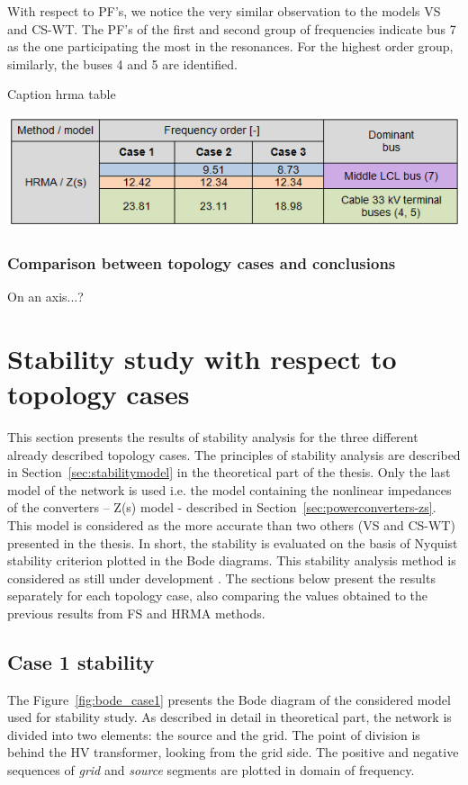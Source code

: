 \documentclass[12pt]{report} %
\begin{document}
With respect to PF's, we notice the very similar observation to the models VS and CS-WT. The PF's of the first and second group of frequencies indicate bus 7 as the one participating the most in the resonances. For the highest order group, similarly, the buses 4 and 5 are identified.

\begin{table}[htb]
	\centering
	\caption{Caption hrma table}
	\includegraphics[width=1\textwidth]{img/Case123/HRMA_Zs_table.png}
  	\label{table:comparison_hrmazs}
\end{table}
\FloatBarrier

\subsubsection{Comparison between topology cases and conclusions}
On an axis...?

\section{Stability study with respect to topology cases}
This section presents the results of stability analysis for the three different already described topology cases. The principles of stability analysis are described in Section~\ref{sec:stabilitymodel} in the theoretical part of the thesis. Only the last model of the network is used i.e. the model containing the nonlinear impedances of the converters – Z(s) model - described in Section~\ref{sec:powerconverters-zs}. This model is considered as the more accurate than two others (VS and CS-WT) presented in the thesis. In short, the stability is evaluated on the basis of Nyquist stability criterion plotted in the Bode diagrams. This stability analysis method is considered as still under development \cite{borwin1}. The sections below present the results separately for each topology case, also comparing the values obtained to the previous results from FS and HRMA methods.

\subsection{Case 1 stability}
The Figure~\ref{fig:bode_case1} presents the Bode diagram of the considered model used for stability study. As described in detail in theoretical part, the network is divided into two elements: the source and the grid. The point of division is behind the HV transformer, looking from the grid side. The positive and negative sequences of \textit{grid} and \textit{source} segments are plotted in domain of frequency.
\end{document}
